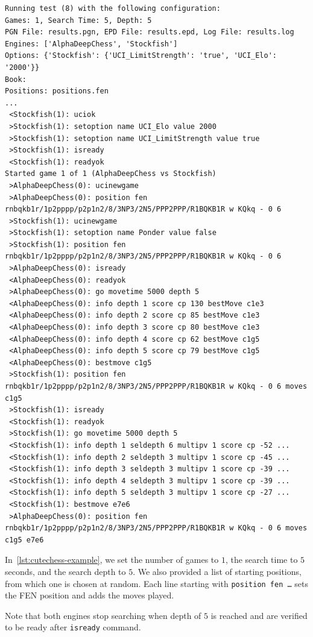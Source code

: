 \begin{lstlisting}[basicstyle=\ttfamily\scriptsize, breaklines=true, frame=single, captionpos=b, caption={Example of \textit{Cutechess}}, label={lst:cutechess-example}]
Running test (8) with the following configuration:
Games: 1, Search Time: 5, Depth: 5
PGN File: results.pgn, EPD File: results.epd, Log File: results.log
Engines: ['AlphaDeepChess', 'Stockfish']
Options: {'Stockfish': {'UCI_LimitStrength': 'true', 'UCI_Elo': '2000'}}
Book: 
Positions: positions.fen
...
 <Stockfish(1): uciok
 >Stockfish(1): setoption name UCI_Elo value 2000
 >Stockfish(1): setoption name UCI_LimitStrength value true
 >Stockfish(1): isready
 <Stockfish(1): readyok
Started game 1 of 1 (AlphaDeepChess vs Stockfish)
 >AlphaDeepChess(0): ucinewgame
 >AlphaDeepChess(0): position fen rnbqkb1r/1p2pppp/p2p1n2/8/3NP3/2N5/PPP2PPP/R1BQKB1R w KQkq - 0 6
 >Stockfish(1): ucinewgame
 >Stockfish(1): setoption name Ponder value false
 >Stockfish(1): position fen rnbqkb1r/1p2pppp/p2p1n2/8/3NP3/2N5/PPP2PPP/R1BQKB1R w KQkq - 0 6
 >AlphaDeepChess(0): isready
 <AlphaDeepChess(0): readyok
 >AlphaDeepChess(0): go movetime 5000 depth 5
 <AlphaDeepChess(0): info depth 1 score cp 130 bestMove c1e3
 <AlphaDeepChess(0): info depth 2 score cp 85 bestMove c1e3
 <AlphaDeepChess(0): info depth 3 score cp 80 bestMove c1e3
 <AlphaDeepChess(0): info depth 4 score cp 62 bestMove c1g5
 <AlphaDeepChess(0): info depth 5 score cp 79 bestMove c1g5
 <AlphaDeepChess(0): bestmove c1g5
 >Stockfish(1): position fen rnbqkb1r/1p2pppp/p2p1n2/8/3NP3/2N5/PPP2PPP/R1BQKB1R w KQkq - 0 6 moves c1g5
 >Stockfish(1): isready
 <Stockfish(1): readyok
 >Stockfish(1): go movetime 5000 depth 5
 <Stockfish(1): info depth 1 seldepth 6 multipv 1 score cp -52 ...
 <Stockfish(1): info depth 2 seldepth 3 multipv 1 score cp -45 ...
 <Stockfish(1): info depth 3 seldepth 3 multipv 1 score cp -39 ...
 <Stockfish(1): info depth 4 seldepth 3 multipv 1 score cp -39 ...
 <Stockfish(1): info depth 5 seldepth 3 multipv 1 score cp -27 ...
 <Stockfish(1): bestmove e7e6
 >AlphaDeepChess(0): position fen rnbqkb1r/1p2pppp/p2p1n2/8/3NP3/2N5/PPP2PPP/R1BQKB1R w KQkq - 0 6 moves c1g5 e7e6
\end{lstlisting}

\noindent In~\cref{lst:cutechess-example}, we set the number of games to $1$, the search time to $5$ seconds, and the search depth to $5$. We also provided a list of starting positions, from which one is chosen at random. Each line starting with \texttt{position fen \ldots} sets the FEN position and adds the moves played.

\vspace{1em}

\noindent Note that both engines stop searching when depth of $5$ is reached and are verified to be ready after \texttt{isready} command.